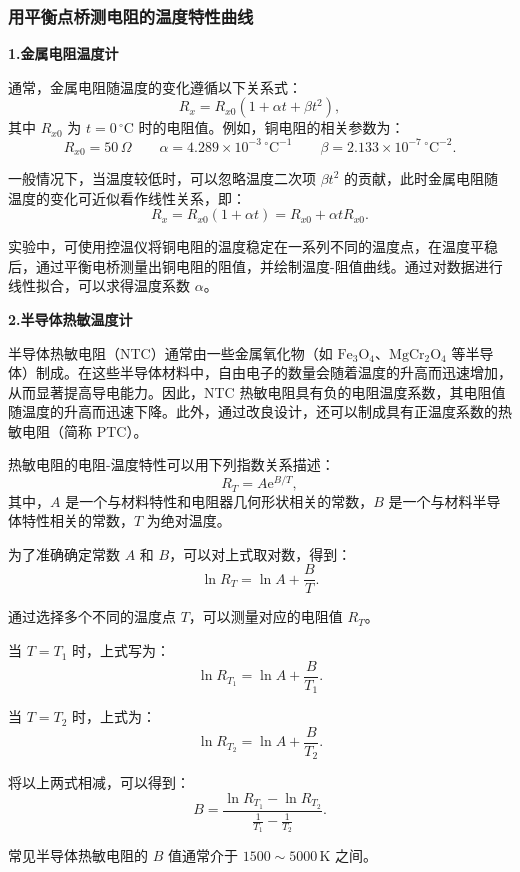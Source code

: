 \documentclass[UTF-8,twoside,cs4size]{ctexart}
\begin{document}
\subsubsection{用平衡点桥测电阻的温度特性曲线}
\textbf{1.金属电阻温度计}

通常，金属电阻随温度的变化遵循以下关系式：
\[
R_x = R_{x0}(1+\alpha t + \beta t^2),
\]
其中 $R_{x0}$ 为 $t = 0 \, ^\circ \mathrm{C}$ 时的电阻值。例如，铜电阻的相关参数为：
\[
R_{x0} = 50 \, \Omega \qquad \alpha = 4.289 \times 10^{-3} \, ^\circ\mathrm{C}^{-1} \qquad \beta = 2.133 \times 10^{-7} \, ^\circ\mathrm{C}^{-2}.
\]

一般情况下，当温度较低时，可以忽略温度二次项 $\beta t^2$ 的贡献，此时金属电阻随温度的变化可近似看作线性关系，即：
\[
R_x = R_{x0}(1+\alpha t) = R_{x0} + \alpha t R_{x0}.
\]

实验中，可使用控温仪将铜电阻的温度稳定在一系列不同的温度点，在温度平稳后，通过平衡电桥测量出铜电阻的阻值，并绘制温度-阻值曲线。通过对数据进行线性拟合，可以求得温度系数 $\alpha$。

\textbf{2.半导体热敏温度计}

半导体热敏电阻（NTC）通常由一些金属氧化物（如 $ \mathrm{Fe_3O_4}$、$\mathrm{MgCr_2O_4}$ 等半导体）制成。在这些半导体材料中，自由电子的数量会随着温度的升高而迅速增加，从而显著提高导电能力。因此，NTC 热敏电阻具有负的电阻温度系数，其电阻值随温度的升高而迅速下降。此外，通过改良设计，还可以制成具有正温度系数的热敏电阻（简称 PTC）。

热敏电阻的电阻-温度特性可以用下列指数关系描述：
\[
R_T = A \mathrm{e}^{B/T},
\]
其中，$A$ 是一个与材料特性和电阻器几何形状相关的常数，$B$ 是一个与材料半导体特性相关的常数，$T$ 为绝对温度。

为了准确确定常数 $A$ 和 $B$，可以对上式取对数，得到：
\begin{equation}\label{2-3-2-2-1}
\ln R_T = \ln A + \frac{B}{T}.
\end{equation}

通过选择多个不同的温度点 $T$，可以测量对应的电阻值 $R_T$。

当 $T = T_1$ 时，上式写为：
\[
\ln R_{T_1} = \ln A + \frac{B}{T_1}.
\]

当 $T = T_2$ 时，上式为：
\[
\ln R_{T_2} = \ln A + \frac{B}{T_2}.
\]

将以上两式相减，可以得到：
\begin{equation}\label{2-3-2-2-2}
B = \frac{\ln R_{T_1} - \ln R_{T_2}}{\frac{1}{T_1} - \frac{1}{T_2}}.
\end{equation}

常见半导体热敏电阻的 $B$ 值通常介于 $1500 \sim 5000 \, \mathrm{K}$ 之间。
\end{document}
